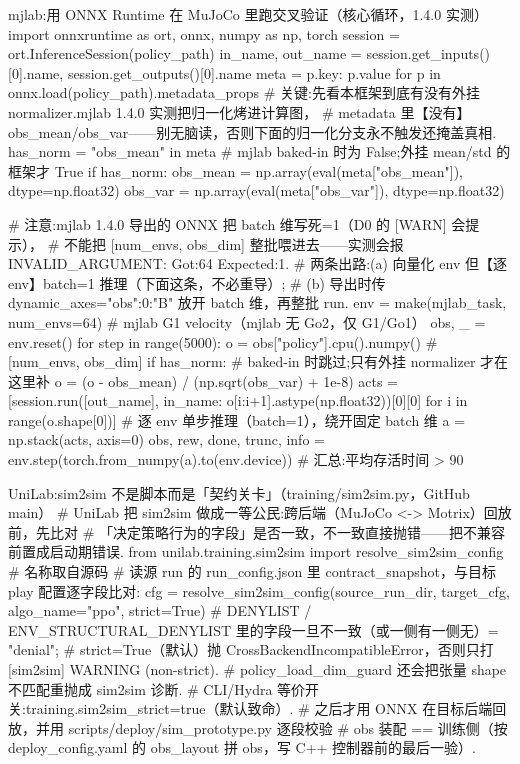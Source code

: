 \begin{codebox}[Python]{mjlab:用 ONNX Runtime 在 MuJoCo 里跑交叉验证（核心循环，1.4.0 实测）}
import onnxruntime as ort, onnx, numpy as np, torch
session = ort.InferenceSession(policy_path)
in_name, out_name = session.get_inputs()[0].name, session.get_outputs()[0].name
meta = {p.key: p.value for p in onnx.load(policy_path).metadata_props}
# 关键:先看本框架到底有没有外挂 normalizer.mjlab 1.4.0 实测把归一化烤进计算图，
#   metadata 里【没有】obs_mean/obs_var——别无脑读，否则下面的归一化分支永不触发还掩盖真相.
has_norm = "obs_mean" in meta                  # mjlab baked-in 时为 False;外挂 mean/std 的框架才 True
if has_norm:
    obs_mean = np.array(eval(meta["obs_mean"]), dtype=np.float32)
    obs_var  = np.array(eval(meta["obs_var"]),  dtype=np.float32)

# 注意:mjlab 1.4.0 导出的 ONNX 把 batch 维写死=1（D0 的 [WARN] 会提示），
#   不能把 [num_envs, obs_dim] 整批喂进去——实测会报 INVALID_ARGUMENT: Got:64 Expected:1.
#   两条出路:(a) 向量化 env 但【逐 env】batch=1 推理（下面这条，不必重导）;
#            (b) 导出时传 dynamic_axes={"obs":{0:"B"}} 放开 batch 维，再整批 run.
env = make(mjlab_task, num_envs=64)            # mjlab G1 velocity（mjlab 无 Go2，仅 G1/Go1）
obs, _ = env.reset()
for step in range(5000):
    o = obs["policy"].cpu().numpy()            # [num_envs, obs_dim]
    if has_norm:                               # baked-in 时跳过;只有外挂 normalizer 才在这里补
        o = (o - obs_mean) / (np.sqrt(obs_var) + 1e-8)
    acts = [session.run([out_name], {in_name: o[i:i+1].astype(np.float32)})[0][0]
            for i in range(o.shape[0])]        # 逐 env 单步推理（batch=1），绕开固定 batch 维
    a = np.stack(acts, axis=0)
    obs, rew, done, trunc, info = env.step(torch.from_numpy(a).to(env.device))
# 汇总:平均存活时间 > 90%
\end{codebox}

\begin{codebox}[Python]{UniLab:sim2sim 不是脚本而是「契约关卡」（training/sim2sim.py，GitHub main）}
# UniLab 把 sim2sim 做成一等公民:跨后端（MuJoCo <-> Motrix）回放前，先比对
# 「决定策略行为的字段」是否一致，不一致直接抛错——把不兼容前置成启动期错误.
from unilab.training.sim2sim import resolve_sim2sim_config  # 名称取自源码
# 读源 run 的 run_config.json 里 contract_snapshot，与目标 play 配置逐字段比对:
cfg = resolve_sim2sim_config(source_run_dir, target_cfg, algo_name="ppo", strict=True)
#   DENYLIST / ENV_STRUCTURAL_DENYLIST 里的字段一旦不一致（或一侧有一侧无）= "denial";
#   strict=True（默认）抛 CrossBackendIncompatibleError，否则只打 [sim2sim] WARNING (non-strict).
#   policy_load_dim_guard 还会把张量 shape 不匹配重抛成 sim2sim 诊断.
# CLI/Hydra 等价开关:training.sim2sim_strict=true（默认致命）.
# 之后才用 ONNX 在目标后端回放，并用 scripts/deploy/sim_prototype.py 逐段校验
#   obs 装配 == 训练侧（按 deploy_config.yaml 的 obs_layout 拼 obs，写 C++ 控制器前的最后一验）.
\end{codebox}

